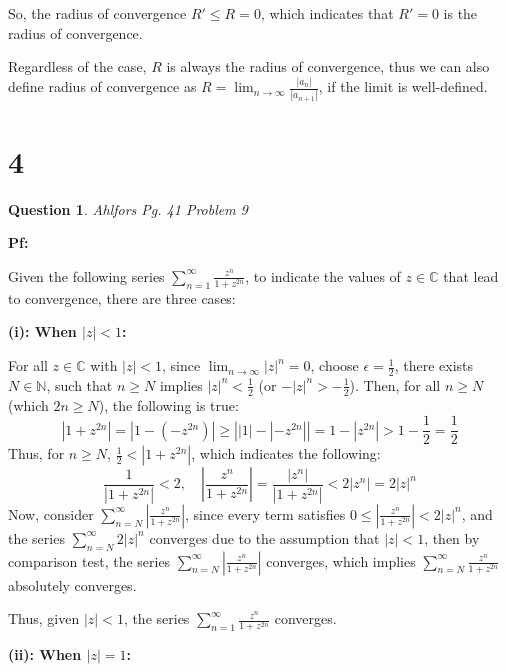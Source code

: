 \documentclass{article}
\newtheorem{question}{Question}
\begin{document}
So, the radius of convergence $R'\leq R=0$, which indicates that $R'=0$ is the radius of convergence.

\hfill

\hfill

\hfill

Regardless of the case, $R$ is always the radius of convergence, thus we can also define radius of convergence as $R=\lim_{n\rightarrow\infty}\frac{|a_n|}{|a_{n+1}|}$, if the limit is well-defined.

\break

\section*{4}
\begin{question}
    Ahlfors Pg. 41 Problem 9
\end{question}

\textbf{Pf:}

Given the following series $\sum_{n=1}^{\infty}\frac{z^n}{1+z^{2n}}$, to indicate the values of $z\in\mathbb{C}$ that lead to convergence, there are three cases:

\hfill

\textbf{(i): When $|z|<1$:}

For all $z\in\mathbb{C}$ with $|z|<1$, since $\lim_{n\rightarrow\infty}|z|^n=0$, choose $\epsilon=\frac{1}{2}$, there exists $N\in\mathbb{N}$, such that 
$n\geq N$ implies $|z|^n < \frac{1}{2}$ (or $-|z|^n > -\frac{1}{2}$). Then, for all $n\geq N$ (which $2n\geq N$), the following is true:
$$|1+z^{2n}| = |1-(-z^{2n})| \geq \left||1|-|-z^{2n}|\right| = 1-|z^{2n}| > 1-\frac{1}{2}=\frac{1}{2}$$
Thus, for $n\geq N$, $\frac{1}{2} < |1+z^{2n}|$, which indicates the following:
$$\frac{1}{|1+z^{2n}|}<2,\quad \left|\frac{z^n}{1+z^{2n}}\right| =\frac{|z^n|}{|1+z^{2n}|}<2|z^n|=2|z|^n$$
Now, consider $\sum_{n=N}^{\infty}\left|\frac{z^n}{1+z^{2n}}\right|$, since every term satisfies $0\leq\left|\frac{z^n}{1+z^{2n}}\right|<2|z|^n$, and the series $\sum_{n=N}^{\infty}2|z|^n$ 
converges due to the assumption that $|z|<1$, then by comparison test, the series $\sum_{n=N}^{\infty}\left|\frac{z^n}{1+z^{2n}}\right|$ converges, which implies
$\sum_{n=N}^{\infty}\frac{z^n}{1+z^{2n}}$ absolutely converges.

Thus, given $|z|<1$, the series $\sum_{n=1}^{\infty}\frac{z^n}{1+z^{2n}}$ converges.

\hfill

\hfill

\textbf{(ii): When $|z|=1$:}
\end{document}
